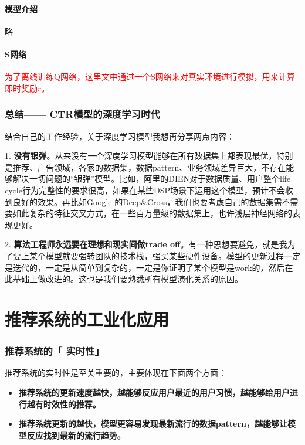 \documentclass[12pt]{article}
\begin{document}
\subsection{模型介绍}
略

\subsection{S网络}
\textcolor{red}{为了离线训练Q网络，这里文中通过一个S网络来对真实环境进行模拟，用来计算即时奖励$r$。}

\section{总结—— CTR模型的深度学习时代}
结合自己的工作经验，关于深度学习模型我想再分享两点内容：

1. \textbf{没有银弹}。从来没有一个深度学习模型能够在所有数据集上都表现最优，特别是推荐、广告领域，各家的数据集，数据pattern、业务领域差异巨大，不存在能够解决一切问题的“银弹”模型。比如，阿里的DIEN对于数据质量、用户整个life cycle行为完整性的要求很高，如果在某些DSP场景下运用这个模型，预计不会收到良好的效果。再比如Google 的Deep\&Cross，我们也要考虑自己的数据集需不需要如此复杂的特征交叉方式，在一些百万量级的数据集上，也许浅层神经网络的表现更好。

2. \textbf{算法工程师永远要在理想和现实间做trade off}。有一种思想要避免，就是我为了要上某个模型就要强转团队的技术栈，强买某些硬件设备。模型的更新过程一定是迭代的，一定是从简单到复杂的，一定是你证明了某个模型是work的，然后在此基础上做改进的。这也是我们要熟悉所有模型演化关系的原因。


\part{推荐系统的工业化应用}
\section{推荐系统的「 实时性」\cite{Real_Time_Requirement_Of_Recommender_System}\cite{Real_Time_Requirement_Of_Model_Update}}
推荐系统的实时性是至关重要的，主要体现在下面两个方面：
\begin{itemize}
\setlength{\itemsep}{0pt}
\setlength{\parsep}{0pt}
\setlength{\parskip}{0pt}
    \item \textbf{推荐系统的更新速度越快，越能够反应用户最近的用户习惯，越能够给用户进行越有时效性的推荐。}
    \item \textbf{推荐系统更新的越快，模型更容易发现最新流行的数据pattern，越能够让模型反应找到最新的流行趋势。}
\end{itemize}
\end{document}
